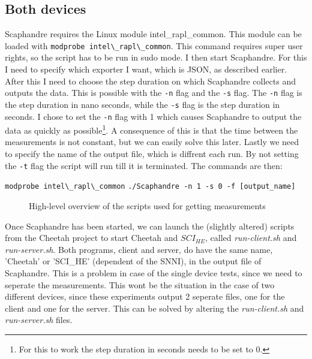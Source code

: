 \documentclass[../thesis.tex]{subfiles}
\begin{document}
\subsection{Both devices}
Scaphandre requires the Linux module intel\_rapl\_common. This module can be loaded with \verb|modprobe intel\_rapl\_common|. This command requires super user rights, so the script has to be run in sudo mode. I then start Scaphandre. For this I need to specify which exporter I want, which is JSON, as described earlier. After this I need to choose the step duration on which Scaphandre collects and outputs the data. This is possible with the \verb|-n| flag and the \verb|-s| flag. The \verb|-n| flag is the step duration in nano seconds, while the \verb|-s| flag is the step duration in seconds. I chose to set the \verb|-n| flag with 1 which causes Scaphandre to output the data as quickly as possible\footnote{For this to work the step duration in seconds needs to be set to 0.}. A consequence of this is that the time between the measurements is not constant, but we can easily solve this later. Lastly we need to specify the name of the output file, which is diffrent each run. By not setting the \verb|-t| flag the script will run till it is terminated. The commands are then:

\verb|modprobe intel\_rapl\_common|
\verb|./Scaphandre -n 1 -s 0 -f [output_name]|

\begin{figure}
    \centering
       
    \caption{High-level overview of the scripts used for getting measurements}
    \label{fig:scripts}
\end{figure}

Once Scaphandre has been started, we can launch the (slightly altered) scripts from the Cheetah project to start Cheetah and $SCI_{HE}$, called \textit{run-client.sh} and \textit{run-server.sh}. Both programs, client and server, do have the same name, 'Cheetah' or 'SCI_HE' (dependent of the SNNI), in the output file of Scaphandre. This is a problem in case of the single device tests, since we need to seperate the measurements. This wont be the situation in the case of two different devices, since these experiments output 2 seperate files, one for the client and one for the server. This can be solved by altering the \textit{run-client.sh} and \textit{run-server.sh} files.
\end{document}
